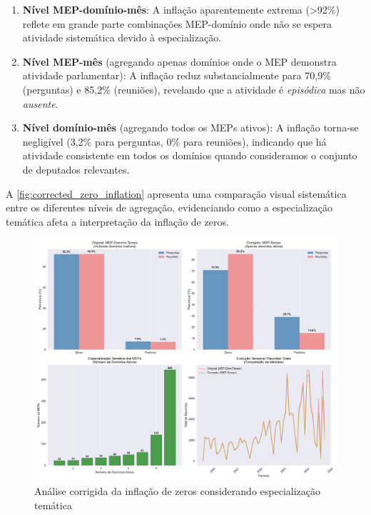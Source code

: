 \begin{enumerate}
    \item \textbf{Nível MEP-domínio-mês}: A inflação aparentemente extrema (>92\%) reflete em grande parte combinações MEP-domínio onde não se espera atividade sistemática devido à especialização.
    
    \item \textbf{Nível MEP-mês} (agregando apenas domínios onde o MEP demonstra atividade parlamentar): A inflação reduz substancialmente para 70,9\% (perguntas) e 85,2\% (reuniões), revelando que a atividade é \textit{episódica} mas não \textit{ausente}.
    
    \item \textbf{Nível domínio-mês} (agregando todos os MEPs ativos): A inflação torna-se negligível (3,2\% para perguntas, 0\% para reuniões), indicando que há atividade consistente em todos os domínios quando consideramos o conjunto de deputados relevantes.
\end{enumerate}

A \autoref{fig:corrected_zero_inflation} apresenta uma comparação visual sistemática entre os diferentes níveis de agregação, evidenciando como a especialização temática afeta a interpretação da inflação de zeros.

\begin{figure}[htbp]
\centering
\includegraphics[width=\textwidth]{figures/fig_corrected_zero_inflation_analysis.pdf}
\caption{Análise corrigida da inflação de zeros considerando especialização temática}
\label{fig:corrected_zero_inflation}
\end{figure}


